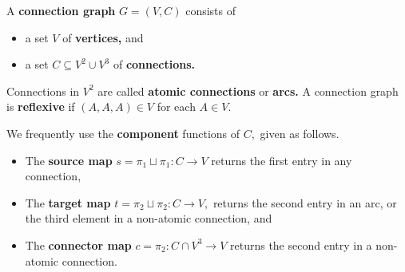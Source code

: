 \begin{definition}
  A \textbf{connection graph} $G = (V, C)$ consists of
  \begin{itemize}
    \item a set $V$ of \textbf{vertices,} and
    \item a set $C \subseteq V^{2} \cup V^{3}$ of \textbf{connections.} %
  \end{itemize}
  Connections in $V^{2}$ are called \textbf{atomic connections} or \textbf{arcs.} A connection graph is \textbf{reflexive} if $(A, A, A) \in V$ for each $A \in V.$

  We frequently use the \textbf{component} functions of $C,$ given as follows.
  \begin{itemize}
  \item The \textbf{source map} $s = \pi_{1} \sqcup \pi_{1}: C \to V$ returns the first entry in any connection,
  \item The \textbf{target map} $t = \pi_{2} \sqcup \pi_{2}: C \to V,$ returns the second entry in an arc, or the third element in a non-atomic connection, and
  \item The \textbf{connector map} $c = \pi_{2}: C \cap V^{3} \to V$ returns the second entry in a non-atomic connection.
  \end{itemize}
\end{definition}






